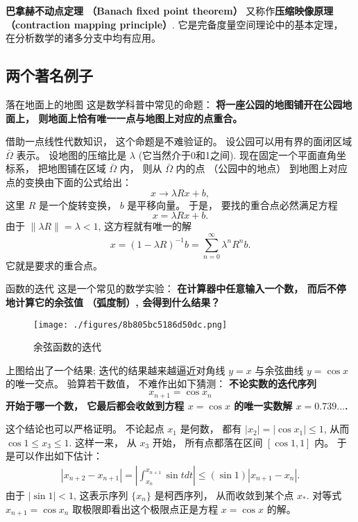

\textbf{巴拿赫不动点定理 （Banach fixed point theorem）} 又称作\textbf{压缩映像原理 （contraction mapping principle）}. 它是完备度量空间理论中的基本定理， 在分析数学的诸多分支中均有应用。

\subsection{两个著名例子}
\begin{example}{落在地面上的地图}
这是数学科普中常见的命题： \textbf{将一座公园的地图铺开在公园地面上， 则地面上恰有唯一一点与地图上对应的点重合。} 

借助一点线性代数知识， 这个命题是不难验证的。 设公园可以用有界的面闭区域 $\bar\Omega$ 表示。 设地图的压缩比是 $\lambda$ (它当然介于0和1之间). 现在固定一个平面直角坐标系， 把地图铺在区域 $\bar\Omega$ 内， 则从 $\bar\Omega$ 内的点 （公园中的地点） 到地图上对应点的变换由下面的公式给出：
$$
x\to \lambda Rx+b,
$$
这里 $R$ 是一个旋转变换， $b$ 是平移向量。 于是， 要找的重合点必然满足方程
$$
x=\lambda Rx+b.
$$
由于 $\|\lambda R\|=\lambda<1$, 这方程就有唯一的解
$$
x=(1-\lambda R)^{-1}b=\sum_{n=0}^{\infty}\lambda^nR^nb.
$$
它就是要求的重合点。
\end{example}

\begin{example}{函数的迭代}
这是一个常见的数学实验： \textbf{在计算器中任意输入一个数， 而后不停地计算它的余弦值 （弧度制）, 会得到什么结果？ }

\begin{figure}[ht]
\centering
\texttt{[image: ./figures/8b805bc5186d50dc.png]}
\caption{余弦函数的迭代} \label{fig_ConMap_1}
\end{figure}

上图给出了一个结果; 迭代的结果越来越逼近对角线 $y=x$ 与余弦曲线 $y=\cos x$ 的唯一交点。 验算若干数值， 不难作出如下猜测： \textbf{不论实数的迭代序列
$$
x_{n+1}=\cos x_n
$$
开始于哪一个数， 它最后都会收敛到方程 $x=\cos x$ 的唯一实数解 $x=0.739...$.}

这个结论也可以严格证明。 不论起点 $x_1$ 是何数， 都有 $|x_2|=|\cos x_1|\leq 1$, 从而 $\cos 1\leq x_3\leq 1$. 这样一来， 从 $x_3$ 开始， 所有点都落在区间 $[\cos 1,1]$ 内。 于是可以作出如下估计：
$$
\begin{aligned}
|x_{n+2}-x_{n+1}|
=\left|\int_{x_{n}}^{x_{n+1}}\sin tdt\right|
\leq (\sin 1)|x_{n+1}-x_n|.
\end{aligned}
$$
由于 $|\sin1|<1$, 这表示序列 $\{x_n\}$ 是柯西序列， 从而收敛到某个点 $x_*$. 对等式 $x_{n+1}=\cos x_n$ 取极限即看出这个极限点正是方程 $x=\cos x$ 的解。
\end{example}


